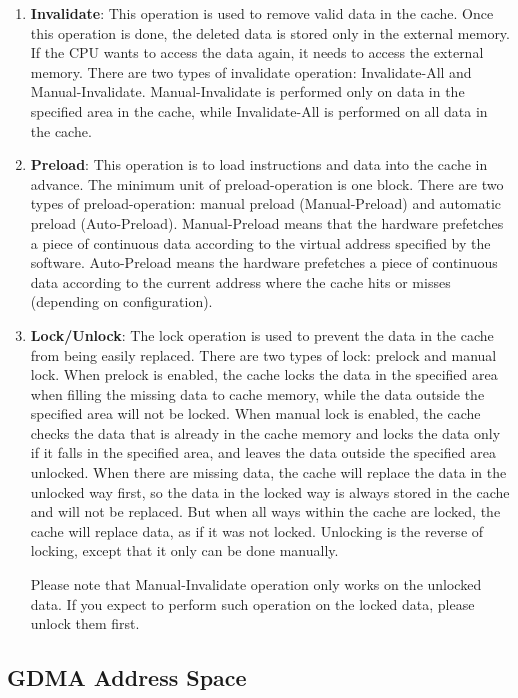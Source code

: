 \documentclass[main\_\_EN.tex]{subfiles}
\begin{document}
\begin{enumerate}
\item \textbf{Invalidate}: This operation is used to remove valid data in the cache. Once this operation is done, the deleted data is stored only in the external memory. If the CPU wants to access the data again, it needs to access the external memory. There are two types of invalidate operation: Invalidate-All and Manual-Invalidate. Manual-Invalidate is performed only on data in the specified area in the cache, while Invalidate-All is performed on all data in the cache.

\item \textbf{Preload}: This operation is to load instructions and data into the cache in advance. The minimum unit of preload-operation is one block. There are two types of preload-operation: manual preload (Manual-Preload) and automatic preload (Auto-Preload). Manual-Preload means that the hardware prefetches a piece of continuous data according to the virtual address specified by the software. Auto-Preload means the hardware prefetches a piece of continuous data according to the current address where the cache hits or misses (depending on configuration).


\item \textbf{Lock/Unlock}: The lock operation is used to prevent the data in the cache from being easily replaced. There are two types of lock: prelock and manual lock. When prelock is enabled, the cache locks the data in the specified area when filling the missing data to cache memory, while the data outside the specified area will not be locked. When manual lock is enabled, the cache checks the data that is already in the cache memory and locks the data only if it falls in the specified area, and leaves the data outside the specified area unlocked.
When there are missing data, the cache will replace the data in the unlocked way first, so the data in the locked way is always stored in the cache and will not be replaced. But when all ways within the cache are locked, the cache will replace data, as if it was not locked. Unlocking is the reverse of locking, except that it only can be done manually.

Please note that Manual-Invalidate operation only works on the unlocked data. If you expect to perform such operation on the locked data, please unlock them first.
\end{enumerate}

\subsection{GDMA Address Space}
\end{document}
